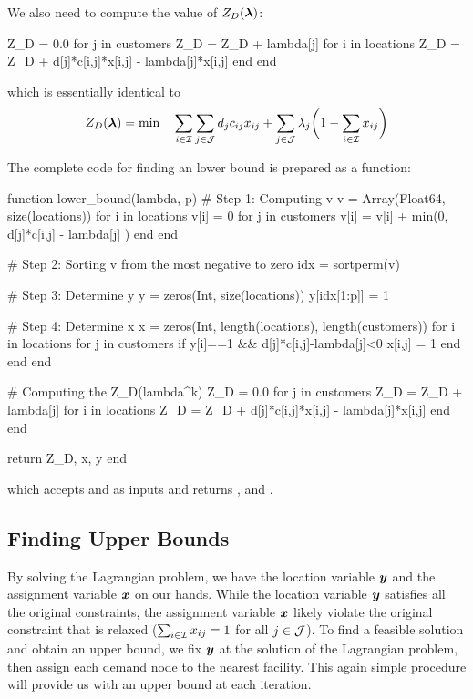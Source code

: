 We also need to compute the value of $Z_D(\boldsymbol{\lambda})$:
\begin{code}
Z_D = 0.0
for j in customers
    Z_D = Z_D + lambda[j]
    for i in locations
        Z_D = Z_D + d[j]*c[i,j]*x[i,j] - lambda[j]*x[i,j]
    end
end
\end{code}
\noindent which is essentially identical to
\[
Z_D(\boldsymbol{\lambda}) = \min \quad \sum_{i\in\mathcal{I}} \sum_{j\in\mathcal{J}} d_j c_{ij} x_{ij}
							+ \sum_{j\in\mathcal{J}} \lambda_j \bigg(1 - \sum_{i\in\mathcal{I}} x_{ij} \bigg)
\]

The complete code for finding an lower bound is prepared as a function:
\begin{code}
function lower_bound(lambda, p)
    # Step 1: Computing v
    v = Array(Float64, size(locations))
    for i in locations
        v[i] = 0
        for j in customers
            v[i] = v[i] + min(0, d[j]*c[i,j] - lambda[j] )
        end
    end

    # Step 2: Sorting v from the most negative to zero
    idx = sortperm(v)

    # Step 3: Determine y
    y = zeros(Int, size(locations))
    y[idx[1:p]] = 1

    # Step 4: Determine x
    x = zeros(Int, length(locations), length(customers))
    for i in locations
        for j in customers
            if y[i]==1 && d[j]*c[i,j]-lambda[j]<0
                x[i,j] = 1
            end
        end
    end

    # Computing the Z_D(lambda^k)
    Z_D = 0.0
    for j in customers
        Z_D = Z_D + lambda[j]
        for i in locations
            Z_D = Z_D + d[j]*c[i,j]*x[i,j] - lambda[j]*x[i,j]
        end
    end

    return Z_D, x, y
end
\end{code}
\noindent which accepts  and  as inputs and returns ,  and .




\subsection{Finding Upper Bounds}
By solving the Lagrangian problem, we have the location variable $\boldsymbol{y}$ and the assignment variable $\boldsymbol{x}$ on our hands. While the location variable $\boldsymbol{y}$ satisfies all the original constraints, the assignment variable $\boldsymbol{x}$ likely violate the original constraint that is relaxed ($\sum_{i\in\mathcal{I}} x_{ij} = 1$ for all $j\in\mathcal{J}$). To find a feasible solution and obtain an upper bound, we fix $\boldsymbol{y}$ at the solution of the Lagrangian problem, then assign each demand node to the nearest facility. This again simple procedure will provide us with an upper bound at each iteration.

